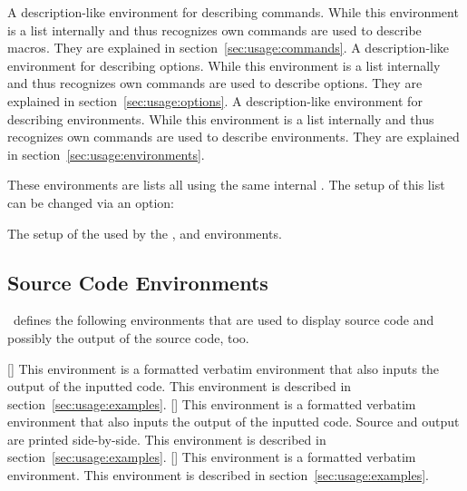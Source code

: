 \documentclass[load-preamble+,babel-options={ngerman,english}]{cnltx-doc}
\begin{document}
\begin{environments}
    A description-like environment for describing commands.  While this
    environment is a list internally and thus recognizes  own
    commands are used to describe macros.  They are explained in
    section~\vref{sec:usage:commands}.
    A description-like environment for describing options.  While this
    environment is a list internally and thus recognizes  own
    commands are used to describe options.  They are explained in
    section~\vref{sec:usage:options}.
    A description-like environment for describing environments.  While this
    environment is a list internally and thus recognizes  own
    commands are used to describe environments.  They are explained in
    section~\vref{sec:usage:environments}.
\end{environments}

These environments are lists all using the same internal .  The
setup of this list can be changed via an option:

\begin{options}
    The setup of the  used by the ,  and
     environments.
\end{options}

\subsection{Source Code Environments}\label{sec:envs:sourcecode}
\cnltxexample\ defines the following environments that are used to display
source code and possibly the output of the source code, too.

\begin{environments}
  []
    This environment is a formatted verbatim environment that also inputs the
    output of the inputted code.  This environment is described in
    section~\vref{sec:usage:examples}.
  []
    This environment is a formatted verbatim environment that also inputs the
    output of the inputted code.  Source and output are printed side-by-side.
    This environment is described in section~\vref{sec:usage:examples}.
  []
    This environment is a formatted verbatim environment.  This environment is
    described in section~\vref{sec:usage:examples}.
\end{environments}
  
\end{document}
